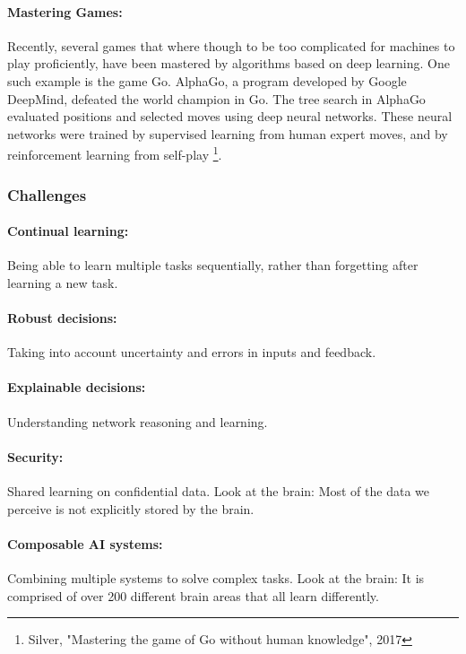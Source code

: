\documentclass[main]{subfiles}
\begin{document}
\paragraph{Mastering Games:} 
Recently, several games that where though to be too complicated for machines to play proficiently, have been mastered by algorithms based on deep learning. One such example is the game Go. AlphaGo, a program developed by Google DeepMind, defeated the world champion in Go. The tree search in AlphaGo evaluated positions and selected moves using deep neural networks. These neural networks were trained by supervised learning from human expert moves, and by reinforcement learning from self-play \footnote{Silver, "Mastering the game of Go without human knowledge", 2017}.

\subsubsection{Challenges}\label{sec:challenges}

\paragraph{Continual learning:}
Being able to learn multiple tasks sequentially, rather than forgetting after learning a new task.
\paragraph{Robust decisions:}
Taking into account uncertainty and errors in inputs and feedback.
\paragraph{Explainable decisions:}
Understanding network reasoning and learning.
\paragraph{Security:}
Shared learning on confidential data. Look at the brain: Most of the data we perceive is not explicitly stored by the brain. 
\paragraph{Composable AI systems:}
Combining multiple systems to solve complex tasks. Look at the brain: It is comprised of over 200 different brain areas that all learn differently. 
\end{document}
